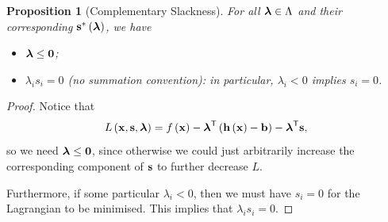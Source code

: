 \documentclass[11pt]{article}
\newtheorem{proposition}[theorem]{Proposition}
\theoremstyle{definition}
\theoremstyle{remark}
\newcommand{\pqty}[1]{\left(#1\right)}
\newcommand{\transpose}{^{\mathsf{T}}}
\begin{document}
\begin{proposition}[Complementary Slackness]\label{optim-unit-0028}
    For all \(\vb*{\lambda} \in \Lambda\) and their corresponding \(\vb{s}^{\ast} \pqty{\vb*{\lambda}}\), we have
    \begin{itemize}
        \item \(\vb*{\lambda} \leq \vb{0}\);
        \item \(\lambda_i s_i = 0\) (no summation convention): in particular, \(\lambda_i < 0\) implies \(s_i = 0\).
    \end{itemize}
\end{proposition}

\begin{proof}
    Notice that
    \[
        L\pqty{\vb{x}, \vb{s}, \vb*{\lambda}} = f\pqty{\vb{x}} - \vb*{\lambda} \transpose \pqty{\vb{h}\pqty{\vb{x}} - \vb{b}} - \vb*{\lambda}\transpose \vb{s},
    \]
    so we need \(\vb*{\lambda} \leq \vb{0}\), since otherwise we could just arbitrarily increase the corresponding component of \(\vb{s}\) to further decrease \(L\).

    Furthermore, if some particular \(\lambda_i < 0\), then we must have \(s_i = 0\) for the Lagrangian to be minimised. This implies that \(\lambda_i s_i = 0\).
\end{proof}
\end{document}

